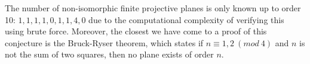 \documentclass[12pt]{article}
\begin{document}
    The number of non-isomorphic finite projective planes is only known up to order 10: $1, 1, 1, 1, 0, 1, 1, 4, 0$
    due to the computational complexity of verifying this using brute force\cite{lam_computer_1991,lam_non-existence_1989}.
    Moreover, the closest we have come to a proof of this conjecture is the Bruck-Ryser theorem, which states if $n \equiv 1,2\ (mod\ 4)$ and $n$ is not the sum of two squares,
    then no plane exists of order $n$.


    \newpage
    
    
\end{document}
